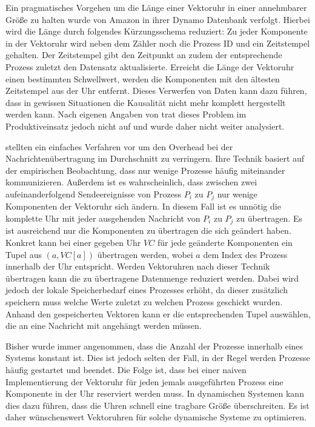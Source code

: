 Ein pragmatisches Vorgehen um die Länge einer Vektoruhr in einer annehmbarer Größe zu halten wurde von Amazon in ihrer Dynamo Datenbank \cite{decandia2007dynamo} verfolgt.
Hierbei wird die Länge durch folgendes Kürzungsschema reduziert:
Zu jeder Komponente in der Vektoruhr wird neben dem Zähler noch die Prozess ID und ein Zeitstempel gehalten.
Der Zeitstempel gibt den Zeitpunkt an zudem der entsprechende Prozess zuletzt den Datensatz aktualisierte.
Erreicht die Länge der Vektoruhr einen bestimmten Schwellwert, werden die Komponenten mit den ältesten Zeitstempel aus der Uhr entfernt.
Dieses Verwerfen von Daten kann dazu führen, dass in gewissen Situationen die Kausalität nicht mehr komplett hergestellt werden kann.
Nach eigenen Angaben von  \cite{decandia2007dynamo} trat dieses Problem im Produktiveinsatz jedoch nicht auf und wurde daher nicht weiter analysiert.

 \cite{singhal1992efficient} stellten ein einfaches Verfahren vor um den Overhead bei der Nachrichtenübertragung im Durchschnitt zu verringern.
Ihre Technik basiert auf der empirischen Beobachtung, dass nur wenige Prozesse häufig miteinander kommunizieren.
Außerdem ist es wahrscheinlich, dass zwischen zwei aufeinanderfolgend Sendeereignisse von Prozess $P_i$ zu $P_j$ nur wenige Komponenten der Vektoruhr sich ändern.
In diesem Fall ist es unnötig die komplette Uhr mit jeder ausgehenden Nachricht von $P_i$ zu $P_j$ zu übertragen.
Es ist ausreichend nur die Komponenten zu übertragen die sich geändert haben.
Konkret kann bei einer gegeben Uhr $VC$ für jede geänderte Komponenten ein Tupel aus $(a, VC[a])$ übertragen werden, wobei $a$ dem Index des Prozess innerhalb der Uhr entspricht.
Werden Vektoruhren nach dieser Technik übertragen kann die zu übertragene Datenmenge reduziert werden.
Dabei wird jedoch der lokale Speicherbedarf eines Prozesses erhöht, da dieser zusätzlich speichern muss welche Werte zuletzt zu welchen Prozess geschickt wurden.
Anhand den gespeicherten Vektoren kann er die entsprechenden Tupel auswählen, die an eine Nachricht mit angehängt werden müssen.

Bisher wurde immer angenommen, dass die Anzahl der Prozesse innerhalb eines Systems konstant ist.
Dies ist jedoch selten der Fall, in der Regel werden Prozesse häufig gestartet und beendet.
Die Folge ist, dass bei einer naiven Implementierung der Vektoruhr für jeden jemals ausgeführten Prozess eine Komponente in der Uhr reserviert werden muss.
In dynamischen Systemen kann dies dazu führen, dass die Uhren schnell eine tragbare Größe überschreiten.
Es ist daher wünschenswert Vektoruhren für solche dynamische Systeme zu optimieren.

